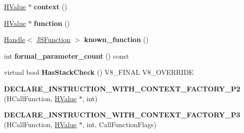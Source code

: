 \begin{DoxyCompactItemize}
\item 
\hypertarget{classv8_1_1internal_1_1_v8___f_i_n_a_l_a911a04b75b22f133c5eb5eafcc2d5f87}{}\hyperlink{classv8_1_1internal_1_1_h_value}{H\+Value} $\ast$ {\bfseries context} ()\label{classv8_1_1internal_1_1_v8___f_i_n_a_l_a911a04b75b22f133c5eb5eafcc2d5f87}

\item 
\hypertarget{classv8_1_1internal_1_1_v8___f_i_n_a_l_aafa16c84ec5aa3ee7b4f08e670d6a69f}{}\hyperlink{classv8_1_1internal_1_1_h_value}{H\+Value} $\ast$ {\bfseries function} ()\label{classv8_1_1internal_1_1_v8___f_i_n_a_l_aafa16c84ec5aa3ee7b4f08e670d6a69f}

\item 
\hypertarget{classv8_1_1internal_1_1_v8___f_i_n_a_l_ac8b790a710c5c0c2af0252021e67ceca}{}\hyperlink{classv8_1_1internal_1_1_handle}{Handle}$<$ \hyperlink{classv8_1_1internal_1_1_j_s_function}{J\+S\+Function} $>$ {\bfseries known\+\_\+function} ()\label{classv8_1_1internal_1_1_v8___f_i_n_a_l_ac8b790a710c5c0c2af0252021e67ceca}

\item 
\hypertarget{classv8_1_1internal_1_1_v8___f_i_n_a_l_a3e8afcf23b7c049c97dc4bf010228275}{}int {\bfseries formal\+\_\+parameter\+\_\+count} () const \label{classv8_1_1internal_1_1_v8___f_i_n_a_l_a3e8afcf23b7c049c97dc4bf010228275}

\item 
\hypertarget{classv8_1_1internal_1_1_v8___f_i_n_a_l_a9289cc6aea057609bb63f1b84ff7edb9}{}virtual bool {\bfseries Has\+Stack\+Check} () V8\+\_\+\+F\+I\+N\+A\+L V8\+\_\+\+O\+V\+E\+R\+R\+I\+D\+E\label{classv8_1_1internal_1_1_v8___f_i_n_a_l_a9289cc6aea057609bb63f1b84ff7edb9}

\item 
\hypertarget{classv8_1_1internal_1_1_v8___f_i_n_a_l_a433e6c71bd3fbcb87ae2696d71adeb3f}{}{\bfseries D\+E\+C\+L\+A\+R\+E\+\_\+\+I\+N\+S\+T\+R\+U\+C\+T\+I\+O\+N\+\_\+\+W\+I\+T\+H\+\_\+\+C\+O\+N\+T\+E\+X\+T\+\_\+\+F\+A\+C\+T\+O\+R\+Y\+\_\+\+P2} (H\+Call\+Function, \hyperlink{classv8_1_1internal_1_1_h_value}{H\+Value} $\ast$, int)\label{classv8_1_1internal_1_1_v8___f_i_n_a_l_a433e6c71bd3fbcb87ae2696d71adeb3f}

\item 
\hypertarget{classv8_1_1internal_1_1_v8___f_i_n_a_l_afd8208e41af05b6c191e0ad230f7b4ef}{}{\bfseries D\+E\+C\+L\+A\+R\+E\+\_\+\+I\+N\+S\+T\+R\+U\+C\+T\+I\+O\+N\+\_\+\+W\+I\+T\+H\+\_\+\+C\+O\+N\+T\+E\+X\+T\+\_\+\+F\+A\+C\+T\+O\+R\+Y\+\_\+\+P3} (H\+Call\+Function, \hyperlink{classv8_1_1internal_1_1_h_value}{H\+Value} $\ast$, int, Call\+Function\+Flags)\label{classv8_1_1internal_1_1_v8___f_i_n_a_l_afd8208e41af05b6c191e0ad230f7b4ef}


\end{DoxyCompactItemize}
